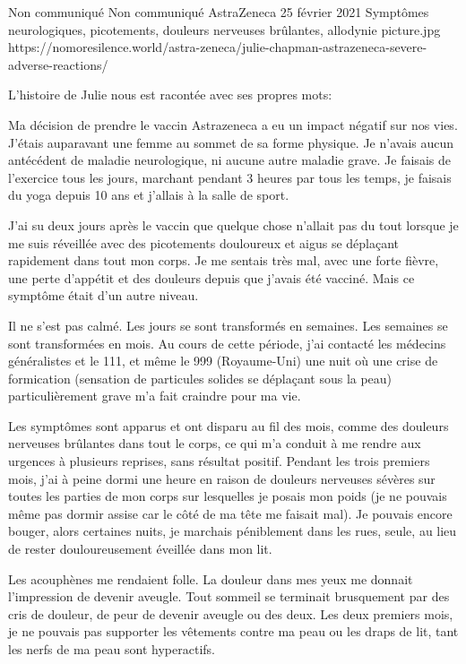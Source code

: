 {Non communiqué}
{Non communiqué}
{AstraZeneca}
{25 février 2021}
{Symptômes neurologiques, picotements, douleurs nerveuses brûlantes, allodynie}
{picture.jpg}
{https://nomoresilence.world/astra-zeneca/julie-chapman-astrazeneca-severe-adverse-reactions/}
{

\normalsize

L'histoire de Julie nous est racontée avec ses propres mots:

Ma décision de prendre le vaccin Astrazeneca a eu un impact négatif sur nos
vies. J'étais auparavant une femme au sommet de sa forme physique. Je n'avais
aucun antécédent de maladie neurologique, ni aucune autre maladie grave. Je
faisais de l'exercice tous les jours, marchant pendant 3 heures par tous les
temps, je faisais du yoga depuis 10 ans et j'allais à la salle de sport.

J'ai su deux jours après le vaccin que quelque chose n'allait pas du tout
lorsque je me suis réveillée avec des picotements douloureux et aigus se
déplaçant rapidement dans tout mon corps. Je me sentais très mal, avec une forte
fièvre, une perte d'appétit et des douleurs depuis que j'avais été vacciné. Mais
ce symptôme était d'un autre niveau.

Il ne s'est pas calmé. Les jours se sont transformés en semaines. Les semaines
se sont transformées en mois. Au cours de cette période, j'ai contacté les
médecins généralistes et le 111, et même le 999 (Royaume-Uni) une nuit où une
crise de formication (sensation de particules solides se déplaçant sous la peau)
particulièrement grave m'a fait craindre pour ma vie.

Les symptômes sont apparus et ont disparu au fil des mois, comme des douleurs
nerveuses brûlantes dans tout le corps, ce qui m'a conduit à me rendre aux
urgences à plusieurs reprises, sans résultat positif. Pendant les trois premiers
mois, j'ai à peine dormi une heure en raison de douleurs nerveuses sévères sur
toutes les parties de mon corps sur lesquelles je posais mon poids (je ne
pouvais même pas dormir assise car le côté de ma tête me faisait mal). Je
pouvais encore bouger, alors certaines nuits, je marchais péniblement dans les
rues, seule, au lieu de rester douloureusement éveillée dans mon lit.

Les acouphènes me rendaient folle. La douleur dans mes yeux me donnait
l'impression de devenir aveugle. Tout sommeil se terminait brusquement par des
cris de douleur, de peur de devenir aveugle ou des deux. Les deux premiers mois,
je ne pouvais pas supporter les vêtements contre ma peau ou les draps de lit,
tant les nerfs de ma peau sont hyperactifs.

}
